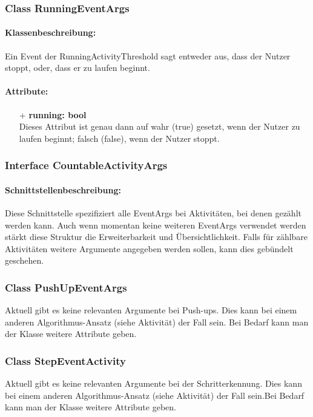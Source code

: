 \documentclass[a4paper,12pt]{article}
\begin{document}
	\subsubsection{Class RunningEventArgs}
	\paragraph{Klassenbeschreibung:}
	Ein Event der RunningActivityThreshold sagt entweder aus, dass der Nutzer stoppt, oder, dass er zu laufen beginnt.
	\paragraph{Attribute:}
	\begin{itemize}
		\item[+] \textbf{running: bool}\\ Dieses Attribut ist genau dann auf wahr (true) gesetzt, wenn der Nutzer zu laufen beginnt; falsch (false), wenn der Nutzer stoppt.
	\end{itemize} 

	\subsubsection{Interface CountableActivityArgs}
	\paragraph{Schnittstellenbeschreibung:}
	Diese Schnittstelle spezifiziert alle EventArgs bei Aktivitäten, bei denen gezählt werden kann. Auch wenn momentan keine weiteren EventArgs verwendet werden stärkt diese Struktur die Erweiterbarkeit und Übersichtlichkeit. Falls für zählbare Aktivitäten weitere Argumente angegeben werden sollen, kann dies gebündelt geschehen.
	
	\subsubsection{Class PushUpEventArgs}
	Aktuell gibt es keine relevanten Argumente bei Push-ups. Dies kann bei einem anderen Algorithmus-Ansatz (siehe Aktivität) der Fall sein. Bei Bedarf kann man der Klasse weitere Attribute geben.
	\subsubsection{Class StepEventActivity}
	Aktuell gibt es keine relevanten Argumente bei der Schritterkennung. Dies kann bei einem anderen Algorithmus-Ansatz (siehe Aktivität) der Fall sein.Bei Bedarf kann man der Klasse weitere Attribute geben.
\end{document}
